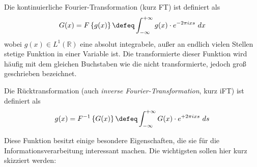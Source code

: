 
Die kontinuierliche Fourier-Transformation (kurz FT) ist definiert als
\begin{equation}
	G(x) = F\left\{g(x)\right\}\defeq\int_{-\infty}^{+\infty} g(x) \cdot e^{-2\pi i x s} ~dx
	\label{eq:ft}
\end{equation}
wobei $g(x)\in L^1(\mathbb{R})$ eine absolut integrabele, außer an endlich vielen Stellen stetige Funktion in einer Variable ist. Die transformierte dieser Funktion wird häufig mit dem gleichen Buchstaben wie die nicht transformierte, jedoch groß geschrieben bezeichnet.

Die Rücktransformation (auch \textit{inverse Fourier-Transformation}, kurz iFT) ist definiert als
\begin{equation}
	g(x) = F^{-1}\left\{G(x)\right\}\defeq\int_{-\infty}^{+\infty} G(x) \cdot e^{+2\pi i x s} ~ds
	\label{eq:ift}
\end{equation}

Diese Funktion besitzt einige besondere Eigenschaften, die sie für die Informationsverarbeitung interessant machen. Die wichtigsten sollen hier kurz skizziert werden:

